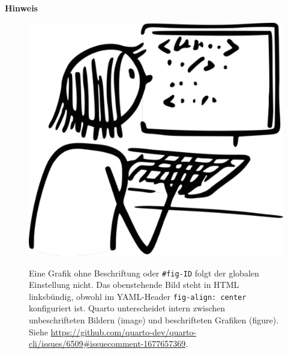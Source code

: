 \documentclass[
  letterpaper,
  DIV=11]{scrartcl}
\begin{document}
\begin{tcolorbox}[enhanced jigsaw, breakable, rightrule=.15mm, leftrule=.75mm, opacityback=0, colframe=quarto-callout-warning-color-frame, toprule=.15mm, left=2mm, colback=white, arc=.35mm, bottomrule=.15mm]
\begin{minipage}[t]{5.5mm}
\textcolor{quarto-callout-warning-color}{\faExclamationTriangle}
\end{minipage}%
\begin{minipage}[t]{\textwidth - 5.5mm}

\vspace{-3mm}\textbf{Hinweis}\vspace{3mm}

\begin{figure}[H]

\begin{minipage}{0.20\linewidth}
\includegraphics{grafiken/working_code_CC0.pdf}\end{minipage}%
%
\begin{minipage}{0.80\linewidth}
Eine Grafik ohne Beschriftung oder \texttt{\#fig-ID} folgt der globalen
Einstellung nicht. Das obenstehende Bild steht in HTML linksbündig,
obwohl im YAML-Header \texttt{fig-align:\ center} konfiguriert ist.
Quarto unterscheidet intern zwischen unbeschrifteten Bildern (image) und
beschrifteten Grafiken (figure). Siehe
\url{https://github.com/quarto-dev/quarto-cli/issues/6509\#issuecomment-1677657369}.\end{minipage}%

\end{figure}%

\end{minipage}%
\end{tcolorbox}
\end{document}
